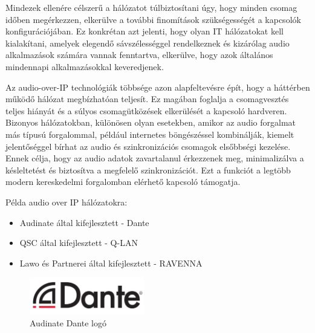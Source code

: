 Mindezek ellenére célszerű a hálózatot túlbiztosítani úgy, hogy minden csomag időben 
megérkezzen, elkerülve a további finomítások szükségességét a kapcsolók konfigurációjában. 
Ez konkrétan azt jelenti, hogy olyan IT hálózatokat kell kialakítani, amelyek elegendő 
sávszélességgel rendelkeznek és kizárólag audio alkalmazások számára vannak fenntartva, 
elkerülve, hogy azok általános mindennapi alkalmazásokkal keveredjenek.


Az audio-over-IP technológiák többsége azon alapfeltevésre épít, hogy a háttérben működő hálózat megbízhatóan teljesít. 
Ez magában foglalja a csomagvesztés teljes hiányát és a súlyos csomagütközések elkerülését a kapcsoló hardveren. 
Bizonyos hálózatokban, különösen olyan esetekben, amikor az audio forgalmat más típusú forgalommal, például 
internetes böngészéssel kombinálják, kiemelt jelentőséggel bírhat az audio és szinkronizációs csomagok elsőbbségi kezelése. 
Ennek célja, hogy az audio adatok zavartalanul érkezzenek meg, minimalizálva a késleltetést és biztosítva a megfelelő szinkronizációt. 
Ezt a funkciót a legtöbb modern kereskedelmi forgalomban elérhető kapcsoló támogatja. \newline

Példa audio over IP hálózatokra:
\begin{itemize}
	\item Audinate által kifejlesztett - Dante
\end{itemize}
\begin{itemize}
	\item QSC által kifejlesztett - Q-LAN
\end{itemize}
\begin{itemize}
	\item Lawo és Partnerei által kifejlesztett - RAVENNA
\end{itemize}
\begin{figure}[H]
	\centering
	\includegraphics[width=50mm, keepaspectratio]{figures/dante_logo.jpg}
	\caption{Audinate Dante logó}
	\label {fig:dante_logo}
\end{figure}
